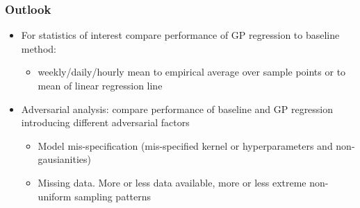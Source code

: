 \documentclass[
	8pt, %
]{beamer}
\begin{document}
\begin{frame}
	\frametitle{Outlook}

	\begin{itemize}
		\item For statistics of interest compare performance of GP regression to baseline method:
		\begin{itemize}
			\item weekly/daily/hourly mean to empirical average over sample points or to mean of linear regression line
		\end{itemize}
	\end{itemize}

	\bigskip %

	\begin{itemize}
		\item Adversarial analysis: compare performance of baseline and GP regression introducing different adversarial
		factors
		\begin{itemize}
			\item Model mis-specification (mis-specified kernel or hyperparameters and non-gausianities)
			\item Missing data. More or less data available, more or less extreme non-uniform sampling patterns
		\end{itemize}

	\end{itemize}

\end{frame}
\end{document}
